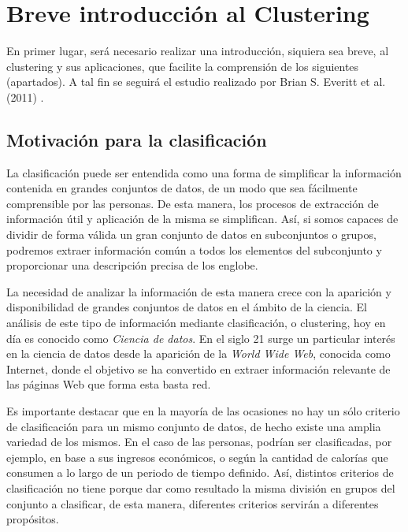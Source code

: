 
\chapter{Breve introducción al Clustering}\label{ch:Breve introducción al Clustering}

En primer lugar, será necesario realizar una introducción, siquiera sea breve, al clustering y sus aplicaciones, que facilite la comprensión de los siguientes (apartados). A tal fin se seguirá el estudio realizado por Brian S. Everitt et al. (2011) \cite{ClusterAnalysis}.

\section{Motivación para la clasificación}

La clasificación puede ser entendida como una forma de simplificar la información contenida en grandes conjuntos de datos, de un modo que sea fácilmente comprensible por las personas. De esta manera, los procesos de extracción de información útil y aplicación de la misma se simplifican. Así, si somos capaces de dividir de forma válida un gran conjunto de datos en subconjuntos o grupos, podremos extraer información común a todos los elementos del subconjunto y proporcionar una descripción precisa de los englobe.

La necesidad de analizar la información de esta manera crece con la aparición y disponibilidad de grandes conjuntos de datos en el ámbito de la ciencia. El análisis de este tipo de información mediante clasificación, o clustering, hoy en día es conocido como \textit{Ciencia de datos}. En el siglo 21 surge un particular interés en la ciencia de datos desde la aparición de la \textit{World Wide Web}, conocida como Internet, donde el objetivo se ha convertido en extraer información relevante de las páginas Web que forma esta basta red.

Es importante destacar que en la mayoría de las ocasiones no hay un sólo criterio de clasificación para un mismo conjunto de datos, de hecho existe una amplia variedad de los mismos. En el caso de las personas, podrían ser clasificadas, por ejemplo, en base a sus ingresos económicos, o según la cantidad de calorías que consumen a lo largo de un periodo de tiempo definido. Así, distintos criterios de clasificación no tiene porque dar como resultado la misma división en grupos del conjunto a clasificar, de esta manera, diferentes criterios servirán a diferentes propósitos.

